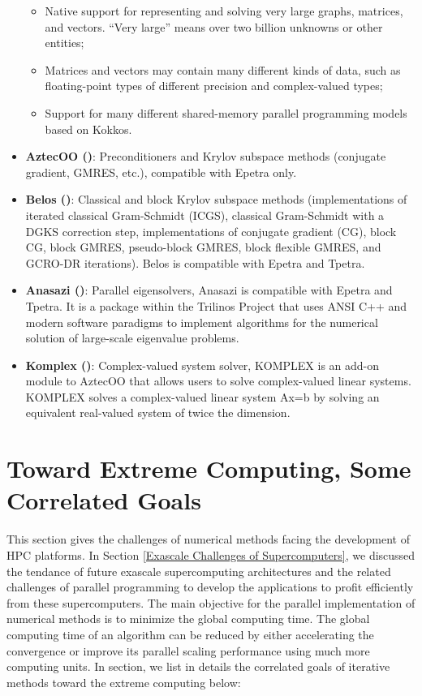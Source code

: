 \begin{itemize}
	\begin{itemize}
		\item Native support for representing and solving very large graphs, matrices, and vectors.  “Very large” means over two billion unknowns or other entities;
		\item Matrices and vectors may contain many different kinds of data, such as floating-point types of different precision and complex-valued types;
		\item Support for many different shared-memory parallel programming models based on Kokkos.
	\end{itemize}
	
	\item \textbf{AztecOO (\cite{heroux2004aztecoo})}: Preconditioners and Krylov subspace methods (conjugate gradient, GMRES, etc.), compatible with Epetra only.
	\item \textbf{Belos (\cite{bavier2012amesos2})}: Classical and block Krylov subspace methods (implementations of iterated classical Gram-Schmidt (ICGS), classical Gram-Schmidt with a DGKS correction step, implementations of conjugate gradient (CG), block CG, block GMRES, pseudo-block GMRES, block flexible GMRES, and GCRO-DR iterations). Belos is compatible with Epetra and Tpetra.
	\item \textbf{Anasazi (\cite{baker2009anasazi})}: Parallel eigensolvers, Anasazi is compatible with Epetra and Tpetra. It is a package within the Trilinos Project that uses ANSI C++ and modern software paradigms to implement algorithms for the numerical solution of large-scale eigenvalue problems.
	\item \textbf{Komplex (\cite{day2001solving})}: Complex-valued system solver, KOMPLEX is an add-on module to AztecOO that allows users to solve complex-valued linear systems. KOMPLEX solves a complex-valued linear system Ax=b by solving an equivalent real-valued system of twice the dimension.
\end{itemize}

\section{Toward Extreme Computing, Some Correlated Goals}

This section gives the challenges of numerical methods facing the development of HPC platforms. In Section \ref{Exascale Challenges of Supercomputers}, we discussed the tendance of future exascale supercomputing architectures and the related challenges of parallel programming to develop the applications to profit efficiently from these supercomputers. The main objective for the parallel implementation of numerical methods is to minimize the global computing time. The global computing time of an algorithm can be reduced by either accelerating the convergence or improve its parallel scaling performance using much more computing units. In section, we list in details the correlated goals of iterative methods toward the extreme computing below:

